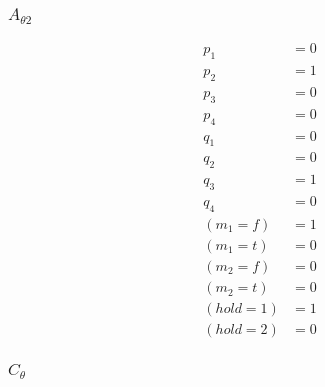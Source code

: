 \documentclass{article}
\begin{document}
\subsubsection{$A_{\theta 2}$}
\begin{align*}
  p_1 &= 0 \\
  p_2 &= 1 \\
  p_3 &= 0 \\
  p_4 &= 0 \\
  q_1 &= 0 \\
  q_2 &= 0 \\
  q_3 &= 1 \\
  q_4 &= 0 \\
  (m_1=f) &= 1 \\
  (m_1=t) &= 0 \\
  (m_2=f) &= 0 \\
  (m_2=t) &= 0 \\
  (hold=1) &= 1 \\
  (hold=2) &= 0
\end{align*}

\subsubsection{$C_\theta$}
\end{document}
